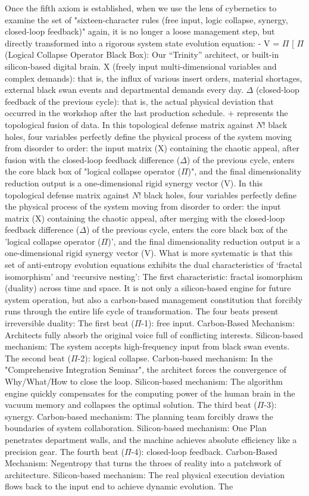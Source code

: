 \documentclass[11pt,a4paper]{article}
\begin{document}
Once the fifth axiom is established, when we use the lens of cybernetics to examine the set of "sixteen-character rules (free input, logic collapse, synergy, closed-loop feedback)" again, it is no longer a loose management step, but directly transformed into a rigorous system state evolution equation: -  V = $\Pi$ [ $\Pi$ (Logical Collapse Operator Black Box): Our “Trinity” architect, or built-in silicon-based digital brain. X (freely input multi-dimensional variables and complex demands): that is, the influx of various insert orders, material shortages, external black swan events and departmental demands every day. $\Delta$ (closed-loop feedback of the previous cycle): that is, the actual physical deviation that occurred in the workshop after the last production schedule. + represents the topological fusion of data. In this topological defense matrix against $N!$ black holes, four variables perfectly define the physical process of the system moving from disorder to order: the input matrix (X) containing the chaotic appeal, after fusion with the closed-loop feedback difference ($\Delta$) of the previous cycle, enters the core black box of "logical collapse operator ($\Pi$)", and the final dimensionality reduction output is a one-dimensional rigid synergy vector (V). In this topological defense matrix against $N!$ black holes, four variables perfectly define the physical process of the system moving from disorder to order: the input matrix (X) containing the chaotic appeal, after merging with the closed-loop feedback difference ($\Delta$) of the previous cycle, enters the core black box of the 'logical collapse operator ($\Pi$)', and the final dimensionality reduction output is a one-dimensional rigid synergy vector (V). What is more systematic is that this set of anti-entropy evolution equations exhibits the dual characteristics of ‘fractal isomorphism’ and ‘recursive nesting’: The first characteristic: fractal isomorphism (duality) across time and space. It is not only a silicon-based engine for future system operation, but also a carbon-based management constitution that forcibly runs through the entire life cycle of transformation. The four beats present irreversible duality: The first beat ($\Pi$-1): free input. Carbon-Based Mechanism: Architects fully absorb the original voice full of conflicting interests. Silicon-based mechanism: The system accepts high-frequency input from black swan events. The second beat ($\Pi$-2): logical collapse. Carbon-based mechanism: In the "Comprehensive Integration Seminar", the architect forces the convergence of Why/What/How to close the loop. Silicon-based mechanism: The algorithm engine quickly compensates for the computing power of the human brain in the vacuum memory and collapses the optimal solution. The third beat ($\Pi$-3): synergy. Carbon-based mechanism: The planning team forcibly draws the boundaries of system collaboration. Silicon-based mechanism: One Plan penetrates department walls, and the machine achieves absolute efficiency like a precision gear. The fourth beat ($\Pi$-4): closed-loop feedback. Carbon-Based Mechanism: Negentropy that turns the throes of reality into a patchwork of architecture. Silicon-based mechanism: The real physical execution deviation flows back to the input end to achieve dynamic evolution. The 
\end{document}

